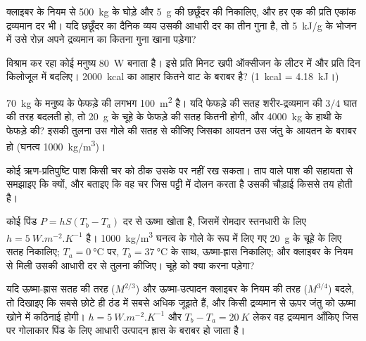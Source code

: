 \begin{exercise}[$\star\star$]\label{exo:b1:organism-environment:6}
क्लाइबर के नियम से \qty{500}{kg} के घोड़े और \qty{5}{g} की छछूँदर की
 निकालिए, और हर एक की प्रति एकांक द्रव्यमान दर भी। यदि
छछूँदर का दैनिक व्यय उसकी आधारी दर का तीन गुना है, तो \qty{5}{kJ/g} के
भोजन में उसे रोज़ अपने द्रव्यमान का कितना गुना खाना पड़ेगा?
\end{exercise}

\begin{exercise}[$\star\star$]\label{exo:b1:organism-environment:7}
विश्राम कर रहा कोई मनुष्य \qty{80}{W} बनाता है। इसे प्रति मिनट खपी
ऑक्सीजन के लीटर में और प्रति दिन किलोजूल में बदलिए। \qty{2000}{kcal} का
आहार कितने वाट के बराबर है? (\qty{1}{kcal} = \qty{4.18}{kJ}।)
\end{exercise}

\begin{exercise}[$\star\star$]\label{exo:b1:organism-environment:8}
\qty{70}{kg} के मनुष्य के फेफड़े की  लगभग \qty{100}{m^2} है।
यदि फेफड़े की सतह शरीर-द्रव्यमान की $3/4$ घात की तरह बदलती हो, तो
\qty{20}{g} के चूहे के फेफड़े की सतह कितनी होगी, और \qty{4000}{kg} के
हाथी के फेफड़े की? इसकी तुलना उस गोले की सतह से कीजिए जिसका आयतन उस जंतु
के आयतन के बराबर हो (घनत्व \qty{1000}{kg/m^3})।
\end{exercise}

\begin{exercise}[$\star\star$]\label{exo:b1:organism-environment:9}
कोई ऋण-प्रतिपुष्टि पाश किसी चर को ठीक उसके  पर नहीं रख सकता।
ताप वाले पाश की सहायता से समझाइए कि क्यों, और बताइए कि वह चर जिस पट्टी
में दोलन करता है उसकी चौड़ाई किससे तय होती है।
\end{exercise}

\begin{exercise}[$\star\star\star$]\label{exo:b1:organism-environment:10}
कोई पिंड $P = hS(T_b - T_a)$ दर से ऊष्मा खोता है, जिसमें रोमदार
स्तनधारी के लिए $h = \qty{5}{W.m^{-2}.K^{-1}}$ है। \qty{1000}{kg/m^3}
घनत्व के गोले के रूप में लिए गए \qty{20}{g} के चूहे के लिए सतह निकालिए;
$T_a = \qty{0}{\celsius}$ पर, $T_b =
\qty{37}{\celsius}$ के साथ, ऊष्मा-ह्रास निकालिए; और क्लाइबर के नियम से
मिली उसकी आधारी दर से तुलना कीजिए। चूहे को क्या करना पड़ेगा?
\end{exercise}

\begin{exercise}[$\star\star\star$]\label{exo:b1:organism-environment:11}
यदि ऊष्मा-ह्रास सतह की तरह ($M^{2/3}$) और ऊष्मा-उत्पादन क्लाइबर के नियम
की तरह ($M^{3/4}$) बदले, तो दिखाइए कि सबसे छोटे  ही ठंड में
सबसे अधिक जूझते हैं, और किसी द्रव्यमान से ऊपर जंतु को ऊष्मा खोने में
कठिनाई होगी। $h = \qty{5}{W.m^{-2}.K^{-1}}$ और
$T_b - T_a = \qty{20}{K}$ लेकर वह द्रव्यमान आँकिए जिस पर गोलाकार पिंड
के लिए आधारी उत्पादन ह्रास के बराबर हो जाता है।
\end{exercise}

